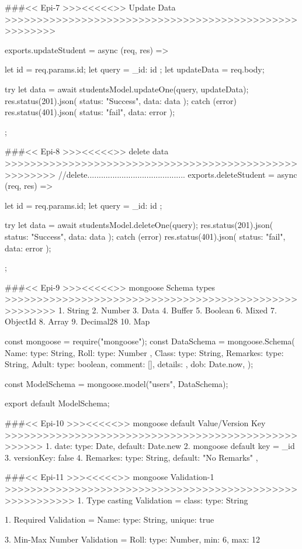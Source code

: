 ###<< Epi-7 >>><<<<<>>  Update Data  >>>>>>>>>>>>>>>>>>>>>>>>>>>>>>>>>>>>>>>>>>>>>>>>>>>>>>

exports.updateStudent = async (req, res) => {
  let id = req.params.id;
  let query = { _id: id };
  let updateData = req.body;

  try {
    let data = await studentsModel.updateOne(query, updateData);
    res.status(201).json({ status: "Success", data: data });
  } catch (error) {
    res.status(401).json({ status: "fail", data: error });
  }
};

###<< Epi-8 >>><<<<<>> delete data  >>>>>>>>>>>>>>>>>>>>>>>>>>>>>>>>>>>>>>>>>>>>>>>>>>>>>>
//delete...........................................
exports.deleteStudent = async (req, res) => {
  let id = req.params.id;
  let query = { _id: id };

  try {
    let data = await studentsModel.deleteOne(query);
    res.status(201).json({ status: "Success", data: data });
  } catch (error) {
    res.status(401).json({ status: "fail", data: error });
  }
};

###<< Epi-9 >>><<<<<>> mongoose Schema types   >>>>>>>>>>>>>>>>>>>>>>>>>>>>>>>>>>>>>>>>>>>>>>>>>>>>>>
    1. String
    2. Number
    3. Data
    4. Buffer
    5. Boolean
    6. Mixed
    7. ObjectId
    8. Array
    9. Decimal28
    10. Map

  const mongoose = require("mongoose");
  const DataSchema = mongoose.Schema({
      Name: {type: String},
      Roll: {type: Number },
      Class: {type: String},
      Remarkes: {type: String},
      Adult: {type: boolean},
      comment: [],
      details: {},
      dob: Date.now,
    });
    
    const ModelSchema = mongoose.model("users", DataSchema);
    
    export default ModelSchema;

###<< Epi-10 >>><<<<<>> mongoose default Value/Version Key >>>>>>>>>>>>>>>>>>>>>>>>>>>>>>>>>>>>>>>>>>>>>>>>>>>>
1. date: {type: Date, default: Date.new}
2. mongoose default key =  _id
3. {versionKey: false} 
4. Remarkes: { type: String, default: "No Remarks" },


###<< Epi-11 >>><<<<<>> mongoose Validation-1 >>>>>>>>>>>>>>>>>>>>>>>>>>>>>>>>>>>>>>>>>>>>>>>>>>>>>>>>>
1. Type casting Validation = class: {type: String}

1. Required Validation = Name: {type: String, unique: true}

3. Min-Max Number Validation = Roll: {type: Number, min: 6, max: 12}

